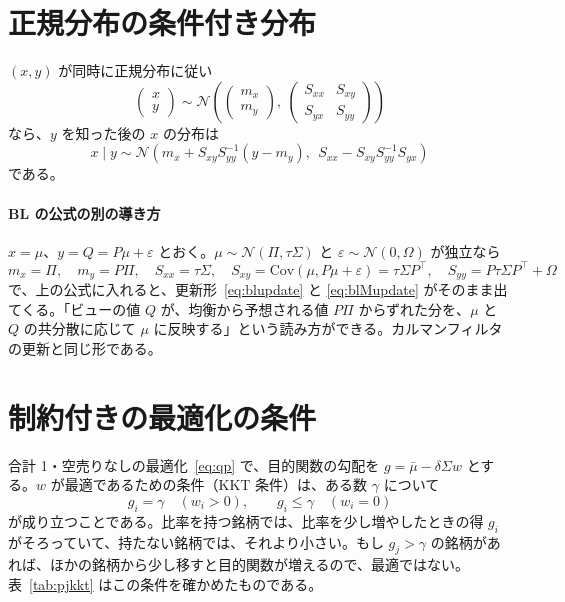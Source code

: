 \documentclass[xelatex,ja=standard,jafont=hiragino-pron,a4paper,11pt,openany]{bxjsreport}
\newcommand{\T}{^{\top}}
\newcommand{\mub}{\bar{\mu}}
\newcommand{\tabref}[1]{表~\ref{#1}}
\begin{document}
\section{正規分布の条件付き分布}

$(x, y)$ が同時に正規分布に従い
\[
\begin{pmatrix} x \\ y \end{pmatrix} \sim \mathcal{N}\left(\begin{pmatrix} m_x \\ m_y \end{pmatrix},\ \begin{pmatrix} S_{xx} & S_{xy} \\ S_{yx} & S_{yy} \end{pmatrix}\right)
\]
なら、$y$ を知った後の $x$ の分布は
\[
x \mid y \sim \mathcal{N}\left(m_x + S_{xy}S_{yy}^{-1}(y - m_y),\ \ S_{xx} - S_{xy}S_{yy}^{-1}S_{yx}\right)
\]
である。

\paragraph{BL の公式の別の導き方}
$x = \mu$、$y = Q = P\mu + \varepsilon$ とおく。$\mu \sim \mathcal{N}(\Pi, \tau\Sigma)$ と $\varepsilon \sim \mathcal{N}(0, \Omega)$ が独立なら
\[
m_x = \Pi,\quad m_y = P\Pi,\quad S_{xx} = \tau\Sigma,\quad S_{xy} = \mathrm{Cov}(\mu, P\mu + \varepsilon) = \tau\Sigma P\T,\quad S_{yy} = P\tau\Sigma P\T + \Omega
\]
で、上の公式に入れると、更新形~\eqref{eq:blupdate} と \eqref{eq:blMupdate} がそのまま出てくる。「ビューの値 $Q$ が、均衡から予想される値 $P\Pi$ からずれた分を、$\mu$ と $Q$ の共分散に応じて $\mu$ に反映する」という読み方ができる。カルマンフィルタの更新と同じ形である。

\section{制約付きの最適化の条件}

合計 1・空売りなしの最適化~\eqref{eq:qp} で、目的関数の勾配を $g = \mub - \delta\Sigma w$ とする。$w$ が最適であるための条件（KKT 条件）は、ある数 $\gamma$ について
\[
g_i = \gamma \quad (w_i > 0),\qquad g_i \le \gamma \quad (w_i = 0)
\]
が成り立つことである。比率を持つ銘柄では、比率を少し増やしたときの得 $g_i$ がそろっていて、持たない銘柄では、それより小さい。もし $g_j > \gamma$ の銘柄があれば、ほかの銘柄から少し移すと目的関数が増えるので、最適ではない。\tabref{tab:pjkkt} はこの条件を確かめたものである。
\end{document}
